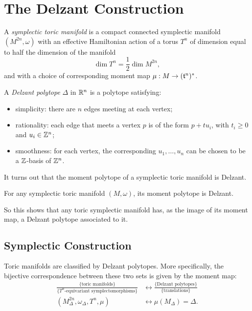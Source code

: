 \section{The Delzant Construction}

\begin{defn}
	A \emph{symplectic toric manifold} is a compact connected symplectic manifold $(M^{2n},\omega)$  with an effective Hamiltonian action of a torus $T^{n}$ of dimension equal to half the dimension of the manifold
	\begin{equation*}
	\dim T^{n} = \frac{1}{2}\dim M^{2n},
	\end{equation*}
	and with a choice of corresponding moment map $\mu: M \rightarrow (\mathfrak{t}^{n})^{\ast}$.
\end{defn}


\begin{defn}
	A \emph{Delzant polytope} $\Delta$ in $\mathbb{R}^{n}$ is a polytope satisfying:
	\begin{itemize}
		\item simplicity: there are $n$ edges meeting at each vertex;
		\item rationality: each edge that meets a vertex $p$ is of the form $p + tu_{i}$, with $t_{i} \geq 0$ and $u_{i} \in \mathbb{Z}^{n}$;
		\item smoothness: for each vertex, the corresponding $u_{1},\ldots, u_{n}$ can be chosen to be a $\mathbb{Z}$-basis of $\mathbb{Z}^{n}$.
	\end{itemize}
\end{defn}

It turns out that the moment polytope of a symplectic toric manifold is Delzant.

\begin{lem}
	For any symplectic toric manifold $(M,\omega)$, its moment polytope is Delzant.
\end{lem}

So this shows that any toric symplectic manifold has, as the image of its moment map, a Delzant polytope associated to it.

\subsection{Symplectic Construction}

\begin{thm}
	Toric manifolds are classified by Delzant polytopes. More specifically, the bijective correspondence between these two sets is given by the moment map:
	\begin{equation*}
	\begin{split}
	\frac{\{\text{toric manifolds}\}}{\{ T^{n}\text{-equivariant symplectomorphisms}\}} &\longleftrightarrow \frac{\{\text{Delzant polytopes}\}}{\{\text{translations}\}}\\
	(M^{2n}_{\Delta}, \omega_{\Delta}, T^{n}, \mu) &\longleftrightarrow \mu(M_{\Delta}) = \Delta.
	\end{split}
	\end{equation*}
\end{thm}

